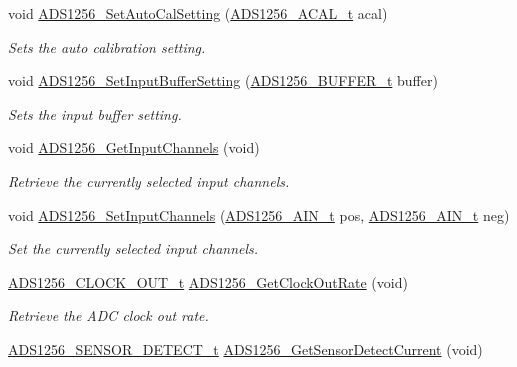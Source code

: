 \begin{DoxyCompactItemize}
void \hyperlink{group__ads1256__driver_ga7dbd4e23a723295a60adc8a7a97b9c5a}{A\-D\-S1256\-\_\-\-Set\-Auto\-Cal\-Setting} (\hyperlink{group__ads1256__driver_ga17864ca559c443a262068f0d19406113}{A\-D\-S1256\-\_\-\-A\-C\-A\-L\-\_\-t} acal)
\begin{DoxyCompactList}\small\item\em Sets the auto calibration setting. \end{DoxyCompactList}\item 
void \hyperlink{group__ads1256__driver_ga0d74a1bb54e74bd1ef8af302471d3905}{A\-D\-S1256\-\_\-\-Set\-Input\-Buffer\-Setting} (\hyperlink{group__ads1256__driver_ga12f71f8fc93fe63fb3c855ddd2070890}{A\-D\-S1256\-\_\-\-B\-U\-F\-F\-E\-R\-\_\-t} buffer)
\begin{DoxyCompactList}\small\item\em Sets the input buffer setting. \end{DoxyCompactList}\item 
void \hyperlink{group__ads1256__driver_ga9b6a25919b727c6e438f8bddf36f10b0}{A\-D\-S1256\-\_\-\-Get\-Input\-Channels} (void)
\begin{DoxyCompactList}\small\item\em Retrieve the currently selected input channels. \end{DoxyCompactList}\item 
void \hyperlink{group__ads1256__driver_ga2bf7d5627d8645de8b27842a006653bd}{A\-D\-S1256\-\_\-\-Set\-Input\-Channels} (\hyperlink{group__ads1256__driver_ga7eac069c538033668b7baeca198def8f}{A\-D\-S1256\-\_\-\-A\-I\-N\-\_\-t} pos, \hyperlink{group__ads1256__driver_ga7eac069c538033668b7baeca198def8f}{A\-D\-S1256\-\_\-\-A\-I\-N\-\_\-t} neg)
\begin{DoxyCompactList}\small\item\em Set the currently selected input channels. \end{DoxyCompactList}\item 
\hyperlink{group__ads1256__driver_ga2d683909a58aa0617ee7c5d06d0a489f}{A\-D\-S1256\-\_\-\-C\-L\-O\-C\-K\-\_\-\-O\-U\-T\-\_\-t} \hyperlink{group__ads1256__driver_ga047a9418e182cce649f167169e3a72bf}{A\-D\-S1256\-\_\-\-Get\-Clock\-Out\-Rate} (void)
\begin{DoxyCompactList}\small\item\em Retrieve the A\-D\-C clock out rate. \end{DoxyCompactList}\item 
\hyperlink{group__ads1256__driver_gaa3102e98865ba4e72463676779cd62d4}{A\-D\-S1256\-\_\-\-S\-E\-N\-S\-O\-R\-\_\-\-D\-E\-T\-E\-C\-T\-\_\-t} \hyperlink{group__ads1256__driver_ga7ce3f5d5b256eeeba15bd2ad17c1010a}{A\-D\-S1256\-\_\-\-Get\-Sensor\-Detect\-Current} (void)

\end{DoxyCompactItemize}
